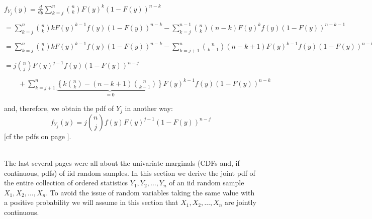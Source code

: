 \documentclass[12pt]{article}
\begin{document}
\noindent $f_{Y_j}(y) =\frac d{dy}\sum_{k=j}^n{n\choose k}F(y)^k(1-F(y))^{n-k}$\medskip

\noindent $=\sum_{k=j}^n{n\choose k}kF(y)^{k-1}f(y)(1-F(y))^{n-k} - \sum_{k=j}^{n-1}{n\choose k}(n-k)F(y)^kf(y)(1-F(y))^{n-k-1}$\medskip

\noindent $=\sum_{k=j}^n{n\choose k}kF(y)^{k-1}f(y)(1-F(y))^{n-k} - \sum_{k=j+1}^{n}{n\choose k-1}(n-k+1)F(y)^{k-1}f(y)(1-F(y))^{n-k}$\medskip

\noindent $=j{n\choose j}F(y)^{j-1}f(y)(1-F(y))^{n-j}$

$\qquad +\sum_{k=j+1}^n\underbrace{\left\{k{n\choose k}-(n-k+1){n\choose k-1}\right\}}_{=0}F(y)^{k-1}f(y)(1-F(y))^{n-k}$

\noindent and, therefore, we obtain the pdf of $Y_j$ in another way:
$$f_{Y_j}(y) = j{n\choose j}f(y) F(y)^{j-1}(1-F(y))^{n-j}$$
[cf the pdfs on page \pageref{pdfofYj}].



\newpage




\\
\noindent The last several pages were all about the univariate marginals (CDFs and, if continuous, pdfs) of iid random samples. In this section we derive the joint pdf
of the entire collection of ordered statistics $Y_1,Y_2,\dots,Y_n$ of an iid random sample $X_1,X_2,\dots,X_n$.  To avoid the issue of random variables taking the same value with a positive probability we will assume in this section that $X_1,X_2,\dots,X_n$ are jointly continuous. \\
\end{document}
